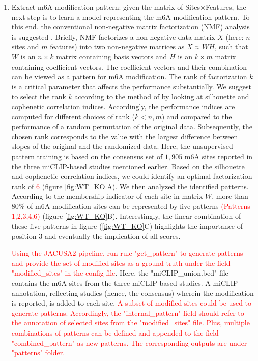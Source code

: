 \documentclass[times, 11pt, a4paper]{article}
\begin{document}
\begin{enumerate}
	\item Extract m6A modification pattern: given the matrix of Sites$\times$Features, the next step is to learn a model representing the m6A modification pattern. To this end, the conventional non-negative matrix factorization (NMF) analysis is suggested \citep{lee1999learning}. Briefly, NMF factorizes a non-negative data matrix $X$ (here: $n$ sites and $m$ features) into two non-negative matrices as $X \approx WH$, such that $W$ is an $n\times k$ matrix containing basis vectors and $H$ is an $k \times m$ matrix containing coefficient vectors. The coefficient vectors and their combination can be viewed as a pattern for m6A modification. The rank of factorization $k$ is a critical parameter that affects the performance substantially. We suggest to select the rank $k$ according to the method of \cite{frigyesi2008non} by looking at silhouette \citep{rousseeuw1987silhouettes} and cophenetic correlation \citep{brunet2004metagenes} indices. Accordingly, the performance indices are computed for different choices of rank ($k<n,m$) and compared to the performance of a random permutation of the original data. Subsequently, the chosen rank corresponds to the value with the largest difference between slopes of the original and the randomized data. Here, the unsupervised pattern training is based on the consensus set of $1,905$ m6A sites reported in the three miCLIP-based studies mentioned earlier. Based on the silhouette and cophenetic correlation indices, we could identify an optimal factorization rank of \textcolor{red}{6} (figure \ref{fig:WT_KO}A). We then analyzed the identified patterns. According to the membership indicator of each site in matrix $W$, more than $80\%$ of m6A modification sites can be represented by five patterns \textcolor{red}{(Patterns 1,2,3,4,6)} (figure \ref{fig:WT_KO}B). Interestingly, the linear combination of these five patterns in figure (\ref{fig:WT_KO}C) highlights the importance of position 3 and eventually the implication of all scores. 
	
	\textcolor{red}{Using the JACUSA2 pipeline, run rule "get\_pattern" to generate patterns and provide the set of modified sites as a ground truth under the field "modified\_sites" in the config file}. Here, the "miCLIP\_union.bed" file contains the m6A sites from the three miCLIP-based studies. A miCLIP annotation, reflecting studies (hence, the consensus) wherein the modification is reported, is added to each site. \textcolor{red}{A subset of modified sites could be used to generate patterns. Accordingly, the "internal\_pattern" field should refer to the annotation of selected sites from the "modified\_sites" file. Plus, multiple combinations of patterns can be defined and appended to the field "combined\_pattern" as new patterns. The corresponding outputs are under "patterns" folder. } 
	

\end{enumerate}
\end{document}
